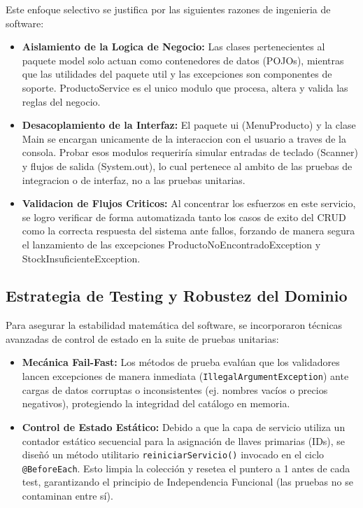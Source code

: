 \documentclass[12pt,a4paper]{article}
\begin{document}
Este enfoque selectivo se justifica por las siguientes razones de ingenieria de software:

\begin{itemize}
    \item \textbf{Aislamiento de la Logica de Negocio:} Las clases pertenecientes al paquete model solo actuan como contenedores de datos (POJOs), mientras que las utilidades del paquete util y las excepciones son componentes de soporte. ProductoService es el unico modulo que procesa, altera y valida las reglas del negocio.
    \item \textbf{Desacoplamiento de la Interfaz:} El paquete ui (MenuProducto) y la clase Main se encargan unicamente de la interaccion con el usuario a traves de la consola. Probar esos modulos requeriría simular entradas de teclado (Scanner) y flujos de salida (System.out), lo cual pertenece al ambito de las pruebas de integracion o de interfaz, no a las pruebas unitarias.
    \item \textbf{Validacion de Flujos Criticos:} Al concentrar los esfuerzos en este servicio, se logro verificar de forma automatizada tanto los casos de exito del CRUD como la correcta respuesta del sistema ante fallos, forzando de manera segura el lanzamiento de las excepciones ProductoNoEncontradoException y StockInsuficienteException.
\end{itemize}

\subsection{Estrategia de Testing y Robustez del Dominio}
Para asegurar la estabilidad matemática del software, se incorporaron técnicas avanzadas de control de estado en la suite de pruebas unitarias:
\begin{itemize}
\item \textbf{Mecánica Fail-Fast:} Los métodos de prueba evalúan que los validadores lancen excepciones de manera inmediata (\texttt{IllegalArgumentException}) ante cargas de datos corruptas o inconsistentes (ej. nombres vacíos o precios negativos), protegiendo la integridad del catálogo en memoria.
\item \textbf{Control de Estado Estático:} Debido a que la capa de servicio utiliza un contador estático secuencial para la asignación de llaves primarias (IDs), se diseñó un método utilitario \texttt{reiniciarServicio()} invocado en el ciclo \texttt{@BeforeEach}. Esto limpia la colección y resetea el puntero a 1 antes de cada test, garantizando el principio de Independencia Funcional (las pruebas no se contaminan entre sí).
\end{itemize}
\end{document}
